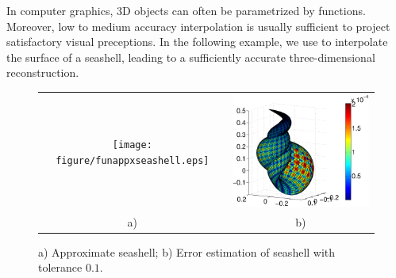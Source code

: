 

In computer graphics, 3D objects can often be parametrized by functions.
Moreover, low to medium accuracy interpolation is usually sufficient to project
satisfactory visual preceptions. In the following example, we use \funappxg to
interpolate the surface of a seashell, leading to a sufficiently accurate
three-dimensional reconstruction.

\begin{figure}[th]
  \centering
  \begin{tabular}{cc}
  \texttt{[image: figure/funappxseashell.eps]} & \includegraphics[width=83mm]{figure/seashellsurferror.eps}\\
  a) & b)
  \end{tabular}
 \caption{a) Approximate seashell; b) Error estimation of seashell with tolerance $0.1$.}
  \label{fig:funappxseashell}
\end{figure}
